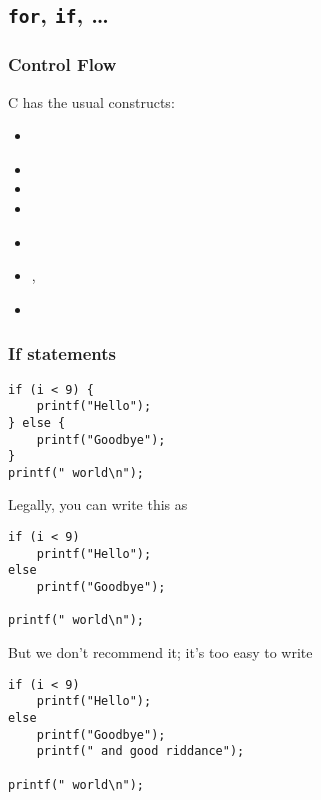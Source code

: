 \documentclass[10pt, t]{beamer}
\begin{document}
\subsection{\texttt{for}, \texttt{if}, \ldots{}}
\label{sec-2_1}
\begin{frame}
\frametitle{Control Flow}
\label{sec-2_1_1}


C has the usual constructs:

\begin{itemize}
\item {}
\end{itemize}
 \pause

\begin{itemize}
\item {}
\item {}
\item {}
\end{itemize}
 \pause

\begin{itemize}
\item {}
\end{itemize}
 \pause

\begin{itemize}
\item {}, 
\end{itemize}
 \pause

\begin{itemize}
\item {}
\end{itemize}
\end{frame}
\begin{frame}[fragile]
\frametitle{If statements}
\label{sec-2_1_2}

\begin{verbatim}
if (i < 9) {
    printf("Hello");
} else {
    printf("Goodbye");
}
printf(" world\n");
\end{verbatim}
\pause
Legally, you can write this as
\begin{verbatim}
if (i < 9)
    printf("Hello");
else
    printf("Goodbye");

printf(" world\n");
\end{verbatim}
But we don't recommend it;
\pause  it's too easy to write
\begin{verbatim}
if (i < 9)
    printf("Hello");
else
    printf("Goodbye");
    printf(" and good riddance");

printf(" world\n");
\end{verbatim}
\end{frame}
\end{document}
